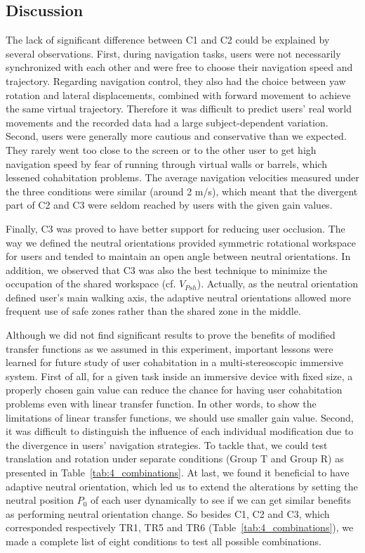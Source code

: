 \subsection{Discussion}
The lack of significant difference between C1 and C2 could be explained by several observations. First, during navigation tasks, users were not necessarily synchronized with each other and were free to choose their navigation speed and trajectory. Regarding navigation control, they also had the choice between yaw rotation and lateral displacements, combined with forward movement to achieve the same virtual trajectory. Therefore it was difficult to predict users' real world movements and the recorded data had a large subject-dependent variation. Second, users were generally more cautious and conservative than we expected. They rarely went too close to the screen or to the other user to get high navigation speed by fear of running through virtual walls or barrels, which lessened cohabitation problems. The average navigation velocities measured under the three conditions were similar (around 2 m/s), which meant that the divergent part of C2 and C3 were seldom reached by users with the given gain values.

Finally, C3 was proved to have better support for reducing user occlusion. The way we defined the neutral orientations provided symmetric rotational workspace for users and tended to maintain an open angle between neutral orientations. In addition, we observed that C3 was also the best technique to minimize the occupation of the shared workspace (cf. $V_{Psh}$). Actually, as the neutral orientation defined user's main walking axis, the adaptive neutral orientations allowed more frequent use of safe zones rather than the shared zone in the middle.

Although we did not find significant results to prove the benefits of modified transfer functions as we assumed in this experiment, important lessons were learned for future study of user cohabitation in a multi-stereoscopic immersive system. First of all, for a given task inside an immersive device with fixed size, a properly chosen gain value can reduce the chance for having user cohabitation problems even with linear transfer function. In other words, to show the limitations of linear transfer functions, we should use smaller gain value. Second, it was difficult to distinguish the influence of each individual modification due to the divergence in users' navigation strategies. To tackle that, we could test translation and rotation under separate conditions (Group T and Group R) as presented in Table~\ref{tab:4_combinations}. At last, we found it beneficial to have adaptive neutral orientation, which led us to extend the alterations by setting the neutral position $P_{0}$ of each user dynamically to see if we can get similar benefits as performing neutral orientation change. So besides C1, C2 and C3, which corresponded respectively TR1, TR5 and TR6 (Table~\ref{tab:4_combinations}), we made a complete list of eight conditions to test all possible combinations.

